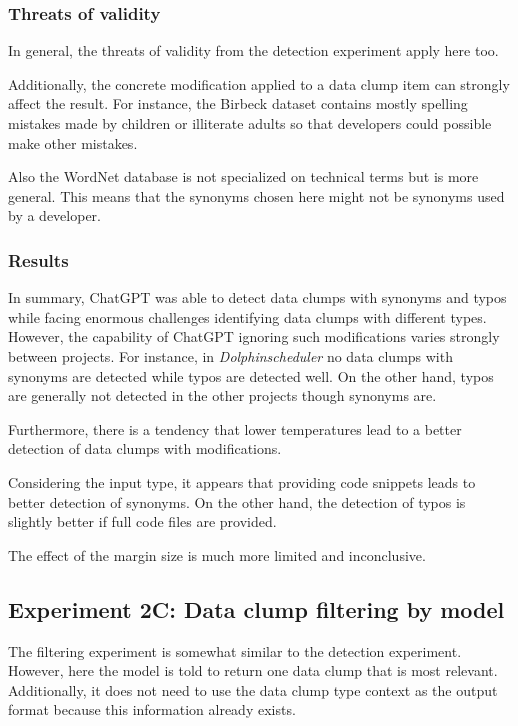 \subsubsection{Threats of validity}
In general, the threats of validity from the detection experiment apply here too. 

Additionally, the concrete modification applied to a data clump item can strongly affect the result. For instance, the Birbeck dataset contains mostly spelling mistakes made by children or illiterate adults so that developers could possible make other mistakes. 

Also the WordNet database is not specialized on technical terms but is more general. This means that the synonyms chosen here might not be synonyms used by a developer.

\subsubsection{Results}

In summary, ChatGPT was able to detect data clumps with synonyms and typos while facing enormous challenges identifying data clumps with different types. However, the capability of ChatGPT ignoring such modifications varies strongly between projects. For instance, in \textit{Dolphinscheduler} no data clumps with synonyms are detected while typos are detected well. On the other hand, typos are generally not detected in the other projects though synonyms are.

Furthermore, there is a tendency that lower temperatures lead to a better detection of data clumps with modifications. 

Considering the input type, it appears that providing code snippets leads to better detection of synonyms. On the other hand, the detection of typos is slightly better if full code files are provided.  

The effect of the margin size is much more limited and inconclusive.

\subsection{Experiment 2C: Data clump filtering by model}

The filtering experiment is somewhat similar to the detection experiment. However, here the model is told to return one data clump that is most relevant. Additionally, it does not need to use the data clump type context as the output format because this information already exists. 

